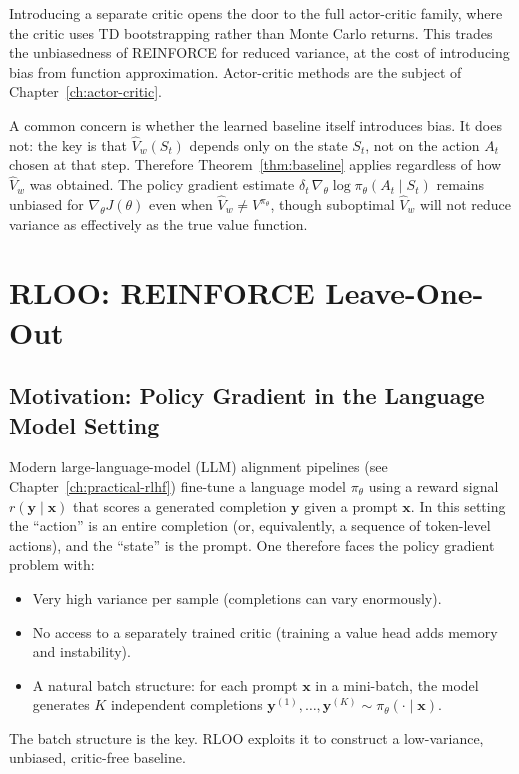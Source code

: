 \begin{remark}
Introducing a separate critic opens the door to the full actor-critic family, where the critic uses TD bootstrapping rather than Monte Carlo returns.  This trades the unbiasedness of REINFORCE for reduced variance, at the cost of introducing bias from function approximation.  Actor-critic methods are the subject of Chapter~\ref{ch:actor-critic}.
\end{remark}

A common concern is whether the learned baseline itself introduces bias.  It does not: the key is that $\hat V_w(S_t)$ depends only on the state $S_t$, not on the action $A_t$ chosen at that step.  Therefore Theorem~\ref{thm:baseline} applies regardless of how $\hat V_w$ was obtained.  The policy gradient estimate $\delta_t\, \nabla_\theta \log \pi_\theta(A_t \mid S_t)$ remains unbiased for $\nabla_\theta J(\theta)$ even when $\hat V_w \neq V^{\pi_\theta}$, though suboptimal $\hat V_w$ will not reduce variance as effectively as the true value function.

\section{RLOO: REINFORCE Leave-One-Out}
\label{sec:rloo}


\subsection{Motivation: Policy Gradient in the Language Model Setting}

Modern large-language-model (LLM) alignment pipelines (see Chapter~\ref{ch:practical-rlhf}) fine-tune a language model $\pi_\theta$ using a reward signal $r(\mathbf{y} \mid \mathbf{x})$ that scores a generated completion $\mathbf{y}$ given a prompt $\mathbf{x}$.  In this setting the ``action'' is an entire completion (or, equivalently, a sequence of token-level actions), and the ``state'' is the prompt.  One therefore faces the policy gradient problem with:
\begin{itemize}[leftmargin=*]
\item Very high variance per sample (completions can vary enormously).
\item No access to a separately trained critic (training a value head adds memory and instability).
\item A natural batch structure: for each prompt $\mathbf{x}$ in a mini-batch, the model generates $K$ independent completions $\mathbf{y}^{(1)}, \ldots, \mathbf{y}^{(K)} \sim \pi_\theta(\cdot \mid \mathbf{x})$.
\end{itemize}
The batch structure is the key.  RLOO exploits it to construct a low-variance, unbiased, critic-free baseline.

